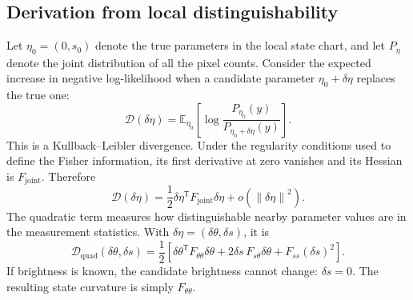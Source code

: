 \documentclass[11pt,a4paper]{article}
\newcommand{\E}{\mathbb E}
\newcommand{\norm}[1]{\left\lVert#1\right\rVert}
\begin{document}
\subsection{Derivation from local distinguishability}
Let $\eta_0=(0,s_0)$ denote the true parameters in the local state chart,
and let $P_\eta$ denote the joint distribution of all the pixel counts.
Consider the expected increase in negative log-likelihood when a candidate
parameter $\eta_0+\delta\eta$ replaces the true one:
\begin{equation}
 \mathcal D(\delta\eta)
 =\E_{\eta_0}\!\left[
 \log\frac{P_{\eta_0}(y)}{P_{\eta_0+\delta\eta}(y)}\right].
\end{equation}
This is a Kullback--Leibler divergence. Under the regularity conditions
used to define the Fisher information, its first derivative at zero
vanishes and its Hessian is $F_{\mathrm{joint}}$. Therefore
\begin{equation}
 \mathcal D(\delta\eta)
 =\frac12\delta\eta^{\mathsf T}F_{\mathrm{joint}}\delta\eta
 +o(\norm{\delta\eta}^2).
\end{equation}
The quadratic term measures how distinguishable nearby parameter values
are in the measurement statistics. With
$\delta\eta=(\delta\theta,\delta s)$, it is
\begin{equation}
 \mathcal D_{\mathrm{quad}}(\delta\theta,\delta s)
 =\frac12\left[
 \delta\theta^{\mathsf T}F_{\theta\theta}\delta\theta
 +2\delta s\,F_{s\theta}\delta\theta
 +F_{ss}(\delta s)^2\right].
 \label{eq:joint-quadratic}
\end{equation}
If brightness is known, the candidate brightness cannot change:
$\delta s=0$. The resulting state curvature is simply
$F_{\theta\theta}$.
\end{document}
